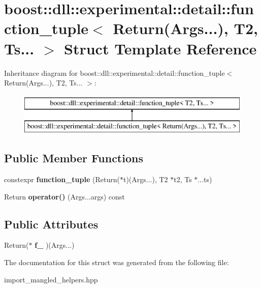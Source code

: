\hypertarget{a00108}{}\section{boost\+:\+:dll\+:\+:experimental\+:\+:detail\+:\+:function\+\_\+tuple$<$ Return(Args...), T2, Ts... $>$ Struct Template Reference}
\label{a00108}
Inheritance diagram for boost\+:\+:dll\+:\+:experimental\+:\+:detail\+:\+:function\+\_\+tuple$<$ Return(Args...), T2, Ts... $>$\+:\begin{figure}[H]
\begin{center}
\leavevmode
\includegraphics[height=2.000000cm]{a00108}
\end{center}
\end{figure}
\subsection*{Public Member Functions}
\begin{DoxyCompactItemize}
\item 
constexpr {\bfseries function\+\_\+tuple} (Return($\ast$t)(Args...), T2 $\ast$t2, Ts $\ast$...ts)\hypertarget{a00108_a61813f1e327bf10eaee0057360fe6626}{}\label{a00108_a61813f1e327bf10eaee0057360fe6626}

\item 
Return {\bfseries operator()} (Args...\+args) const \hypertarget{a00108_a85040b5a2346b76ac3a33af2ef66045e}{}\label{a00108_a85040b5a2346b76ac3a33af2ef66045e}

\end{DoxyCompactItemize}
\subsection*{Public Attributes}
\begin{DoxyCompactItemize}
\item 
Return($\ast$ {\bfseries f\+\_\+} )(Args...)\hypertarget{a00108_a3e05c0f04b51b4e787d64836bd179278}{}\label{a00108_a3e05c0f04b51b4e787d64836bd179278}

\end{DoxyCompactItemize}


The documentation for this struct was generated from the following file\+:\begin{DoxyCompactItemize}
\item 
import\+\_\+mangled\+\_\+helpers.\+hpp\end{DoxyCompactItemize}
